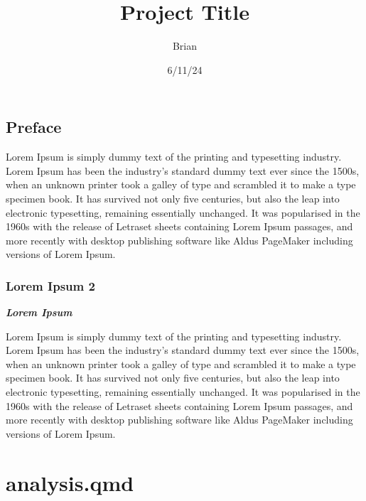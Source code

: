\documentclass[
  letterpaper,
]{scrbook}
\title{Project Title}
\author{Brian}
\date{6/11/24}
\renewcommand*\contentsname{Table of contents}
\newcommand\contentsname{Table of contents}
\begin{document}
\frontmatter
\maketitle
\ifdefined\Shaded\renewenvironment{Shaded}{\begin{tcolorbox}[breakable, boxrule=0pt, interior hidden, borderline west={3pt}{0pt}{shadecolor}, enhanced, frame hidden, sharp corners]}{\end{tcolorbox}}\fi

\renewcommand*\contentsname{Table of contents}
{
\setcounter{tocdepth}{1}
\tableofcontents
}
\mainmatter
{}

\hypertarget{preface}{%
\chapter{Preface}\label{preface}}

Lorem Ipsum is simply dummy text of the printing and typesetting
industry. Lorem Ipsum has been the industry's standard dummy text ever
since the 1500s, when an unknown printer took a galley of type and
scrambled it to make a type specimen book. It has survived not only five
centuries, but also the leap into electronic typesetting, remaining
essentially unchanged. It was popularised in the 1960s with the release
of Letraset sheets containing Lorem Ipsum passages, and more recently
with desktop publishing software like Aldus PageMaker including versions
of Lorem Ipsum.

\hypertarget{lorem-ipsum-2}{%
\section{Lorem Ipsum 2}\label{lorem-ipsum-2}}

\textbf{\emph{Lorem Ipsum}}

Lorem Ipsum is simply dummy text of the printing and typesetting
industry. Lorem Ipsum has been the industry's standard dummy text ever
since the 1500s, when an unknown printer took a galley of type and
scrambled it to make a type specimen book. It has survived not only five
centuries, but also the leap into electronic typesetting, remaining
essentially unchanged. It was popularised in the 1960s with the release
of Letraset sheets containing Lorem Ipsum passages, and more recently
with desktop publishing software like Aldus PageMaker including versions
of Lorem Ipsum.

\newpage

\part{analysis.qmd}
\end{document}
